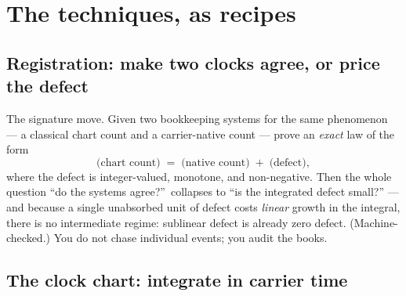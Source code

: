 \documentclass[11pt]{article}
\begin{document}
\section{The techniques, as recipes}

\subsection{Registration: make two clocks agree, or price the defect}

The signature move.  Given two bookkeeping systems for the same phenomenon --- a
classical chart count and a carrier-native count --- prove an \emph{exact} law of
the form
\[
\text{(chart count)} \;=\; \text{(native count)} \;+\; \text{(defect)},
\]
where the defect is integer-valued, monotone, and non-negative.  Then the whole
question ``do the systems agree?''\ collapses to ``is the integrated defect small?''
--- and because a single unabsorbed unit of defect costs \emph{linear} growth in
the integral, there is no intermediate regime: sublinear defect is already zero
defect.  (Machine-checked.)  You do not chase individual events; you audit the
books.

\subsection{The clock chart: integrate in carrier time}
\end{document}
